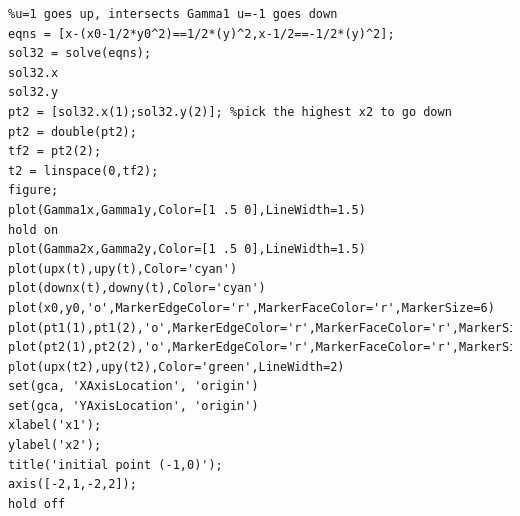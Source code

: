 \documentclass[12pt]{article}
\begin{document}
\begin{lstlisting}
%u=1 goes up, intersects Gamma1 u=-1 goes down
eqns = [x-(x0-1/2*y0^2)==1/2*(y)^2,x-1/2==-1/2*(y)^2];
sol32 = solve(eqns);
sol32.x
sol32.y
pt2 = [sol32.x(1);sol32.y(2)]; %pick the highest x2 to go down
pt2 = double(pt2);
tf2 = pt2(2);
t2 = linspace(0,tf2);
figure;
plot(Gamma1x,Gamma1y,Color=[1 .5 0],LineWidth=1.5)
hold on
plot(Gamma2x,Gamma2y,Color=[1 .5 0],LineWidth=1.5)
plot(upx(t),upy(t),Color='cyan')
plot(downx(t),downy(t),Color='cyan')
plot(x0,y0,'o',MarkerEdgeColor='r',MarkerFaceColor='r',MarkerSize=6)
plot(pt1(1),pt1(2),'o',MarkerEdgeColor='r',MarkerFaceColor='r',MarkerSize=3)
plot(pt2(1),pt2(2),'o',MarkerEdgeColor='r',MarkerFaceColor='r',MarkerSize=3)
plot(upx(t2),upy(t2),Color='green',LineWidth=2)
set(gca, 'XAxisLocation', 'origin')
set(gca, 'YAxisLocation', 'origin')
xlabel('x1');
ylabel('x2');
title('initial point (-1,0)');
axis([-2,1,-2,2]);
hold off
\end{lstlisting}
\end{document}

